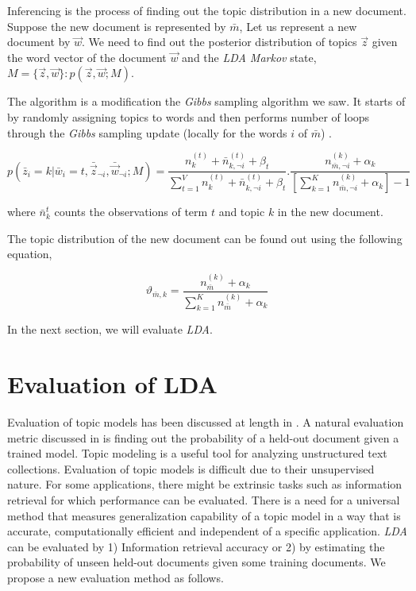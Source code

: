 Inferencing is the process of finding out the topic distribution in a new document. Suppose the new document is represented by \(\bar{m}\),
Let us represent a new document by \(\vec{w}\). We need to find out the posterior distribution of topics \(\vec{z}\) given the word 
vector of the document \(\vec{w}\) and the \textit{LDA Markov} state, \(M = \{ \vec{z},\vec{w} \} \colon p(\vec{z},\vec{w};M) \).

The algorithm is a modification the \textit{Gibbs} sampling algorithm we saw. It starts of by randomly assigning topics to words and then
performs number of loops through the \textit{Gibbs} sampling update (locally for the words \(i\) of \(\bar{m}\)) \citep*{heinrich2005parameter}.

\begin{equation}\label{eqn:inferencereqn}
p(\bar{z}_i=k | \bar{w}_i=t,\bar{\vec{z}}_{\neg i},\bar{\vec{w}}_{\neg i};M) =
\frac{n_{k}^{(t)} + \bar{n}_{k,\neg i}^{(t)} + \beta_t}{\sum_{t=1}^{V} n_{k}^{(t)} + \bar{n}_{k,\neg i}^{(t)} + \beta_t}.
\frac{n_{\bar{m},\neg i}^{(k)} + \alpha_k}{[\sum_{k=1}^{K} n_{\bar{m},\neg i}^{(k)} + \alpha_k]-1}
\end{equation}

where \(\bar{n}_{k}^{t}\) counts the observations of term \(t\) and topic \(k\) in the new document.

The topic distribution of the new document can be found out using the following equation,

\begin{equation}
\vartheta_{\bar{m},k} = \frac{n_{\bar{m}}^{(k)} + \alpha_k}{\sum_{k=1}^{K} n_{\bar{m}}^{(k)} + \alpha_k} 
\end{equation}

In the next section, we will evaluate \textit{LDA}.

\section{Evaluation of LDA}

Evaluation of topic models has been discussed at length in \citep*{wallach2009evaluation}. A natural evaluation metric discussed in 
\citep*{wallach2009evaluation} is finding out the probability of a held-out document given a trained model. Topic modeling is a useful
tool for analyzing unstructured text collections. Evaluation of topic models is difficult due to their unsupervised nature. For some 
applications, there might be extrinsic tasks such as information retrieval for which performance can be evaluated. There is a need for 
a universal method that measures generalization capability of a topic model in a way that is accurate, computationally efficient and
independent of a specific application. \textit{LDA} can be evaluated by 1) Information retrieval accuracy or 2) by estimating the probability
of unseen held-out documents given some training documents. We propose a new evaluation method as follows.

